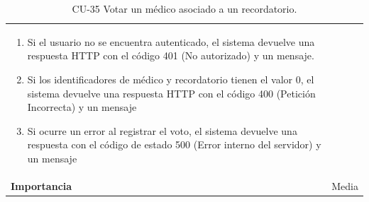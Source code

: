 \begin{table}[p]
\begin{tabularx}{\linewidth}{ p{} p{} }
\begin{enumerate}
			\def\labelenumi{\arabic{enumi}.}
			\tightlist
   			\item Si el usuario no se encuentra autenticado, el sistema devuelve 
                       una respuesta HTTP con el código 401 (No autorizado) y un mensaje.
                \item   Si los identificadores de médico y recordatorio tienen el valor 0, el sistema devuelve una respuesta HTTP con el código 400 (Petición Incorrecta) y un mensaje
                \item Si ocurre un error al registrar el voto, el sistema devuelve una respuesta con el código de estado 500 (Error interno del servidor) y un mensaje
            \end{enumerate}\\
		\textbf{Importancia}          & Media \\
		\bottomrule
	\end{tabularx}
	\caption{CU-35 Votar un médico asociado a un recordatorio.}
\end{table}

